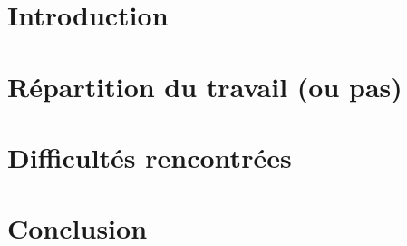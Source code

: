 \documentclass[12pt,a4paper,oneside]{article}
\begin{document}
\newpage

\tableofcontents
\newpage

\section{Introduction}



\section{Répartition du travail (ou pas)}



\section{Difficultés rencontrées}



\section{Conclusion}



\appendix
\end{document}
